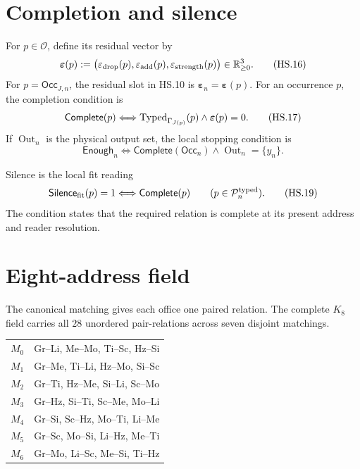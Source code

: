 \documentclass[10pt]{article}
\begin{document}
\section{Completion and silence}

For $p\in\mathscr O$, define its residual vector by
\[
\boldsymbol\varepsilon(p):=
\bigl(\varepsilon_{\rm drop}(p),
\varepsilon_{\rm add}(p),
\varepsilon_{\rm strength}(p)\bigr)
\in\mathbb R_{\ge0}^{3}.
\tag{HS.16}
\]
For $p=\mathsf{Occ}_{J,n}$, the residual slot in HS.10 is
$\boldsymbol\varepsilon_n=\boldsymbol\varepsilon(p)$.
For an occurrence $p$, the completion condition is
\[
\mathsf{Complete}(p)
\Longleftrightarrow
\operatorname{Typed}_{\Gamma_{J(p)}}(p)
\land
\boldsymbol\varepsilon(p)=0.
\tag{HS.17}
\]
If $\operatorname{Out}_n$ is the physical output set, the local stopping
condition is
\[
\mathsf{Enough}_n
\Longleftrightarrow
\mathsf{Complete}(\mathsf{Occ}_n)
\land \operatorname{Out}_n=\{y_n\}.
\tag{HS.18}
\]

Silence is the local fit reading
\[
\mathsf{Silence}_{\rm fit}(p)=1
\Longleftrightarrow
\mathsf{Complete}(p)
\qquad(p\in\mathcal P_n^{\rm typed}).
\tag{HS.19}
\]
The condition states that the required relation is complete at its present
address and reader resolution.

\section{Eight-address field}

\sharedmatching
The canonical matching gives each office one paired relation. The complete
$K_8$ field carries all $28$ unordered pair-relations across seven disjoint
matchings.

\begin{center}
\small
\begin{tabularx}{0.97\linewidth}{@{}lX@{}}
\toprule
$M_0$ & Gr--Li, Me--Mo, Ti--Sc, Hz--Si\\
$M_1$ & Gr--Me, Ti--Li, Hz--Mo, Si--Sc\\
$M_2$ & Gr--Ti, Hz--Me, Si--Li, Sc--Mo\\
$M_3$ & Gr--Hz, Si--Ti, Sc--Me, Mo--Li\\
$M_4$ & Gr--Si, Sc--Hz, Mo--Ti, Li--Me\\
$M_5$ & Gr--Sc, Mo--Si, Li--Hz, Me--Ti\\
$M_6$ & Gr--Mo, Li--Sc, Me--Si, Ti--Hz\\
\bottomrule
\end{tabularx}
\end{center}
\end{document}
